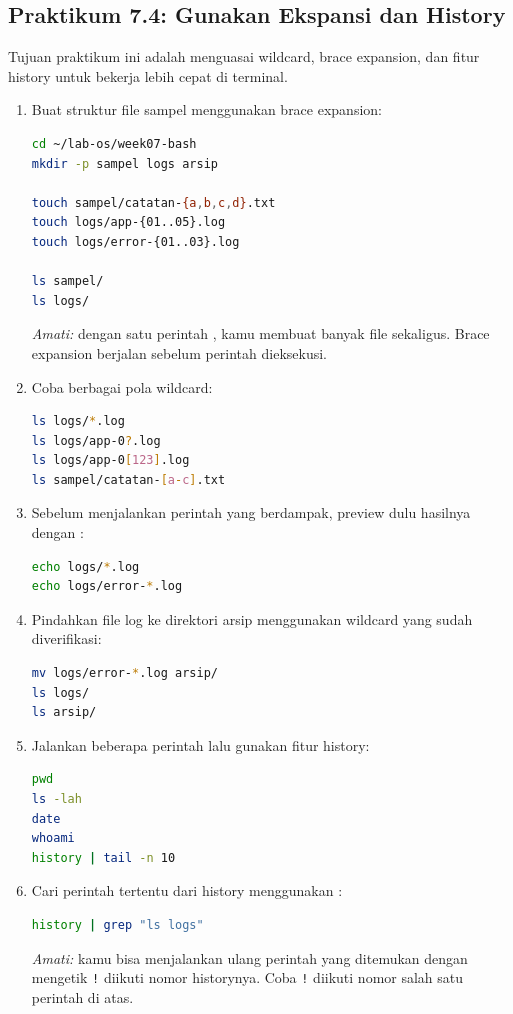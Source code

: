 \subsection*{Praktikum 7.4: Gunakan Ekspansi dan History}

Tujuan praktikum ini adalah menguasai wildcard, brace expansion, dan
fitur history untuk bekerja lebih cepat di terminal.

\begin{enumerate}
    \item Buat struktur file sampel menggunakan brace expansion:
\begin{lstlisting}[language=bash, caption={Membuat file sampel dengan brace expansion}]
cd ~/lab-os/week07-bash
mkdir -p sampel logs arsip

touch sampel/catatan-{a,b,c,d}.txt
touch logs/app-{01..05}.log
touch logs/error-{01..03}.log

ls sampel/
ls logs/
\end{lstlisting}
    \textit{Amati:} dengan satu perintah , kamu membuat banyak
    file sekaligus. Brace expansion berjalan sebelum perintah dieksekusi.

    \item Coba berbagai pola wildcard:
\begin{lstlisting}[language=bash, caption={Menggunakan wildcard untuk memfilter file}]
ls logs/*.log
ls logs/app-0?.log
ls logs/app-0[123].log
ls sampel/catatan-[a-c].txt
\end{lstlisting}

    \item Sebelum menjalankan perintah yang berdampak, preview dulu hasilnya
          dengan :
\begin{lstlisting}[language=bash, caption={Preview wildcard sebelum operasi nyata}]
echo logs/*.log
echo logs/error-*.log
\end{lstlisting}

    \item Pindahkan file log ke direktori arsip menggunakan wildcard yang
          sudah diverifikasi:
\begin{lstlisting}[language=bash, caption={Memindahkan file log ke arsip}]
mv logs/error-*.log arsip/
ls logs/
ls arsip/
\end{lstlisting}

    \item Jalankan beberapa perintah lalu gunakan fitur history:
\begin{lstlisting}[language=bash, caption={Menggunakan history Bash}]
pwd
ls -lah
date
whoami
history | tail -n 10
\end{lstlisting}

    \item Cari perintah tertentu dari history menggunakan :
\begin{lstlisting}[language=bash, caption={Mencari perintah di history}]
history | grep "ls logs"
\end{lstlisting}
    \textit{Amati:} kamu bisa menjalankan ulang perintah yang ditemukan
    dengan mengetik \texttt{!} diikuti nomor historynya. Coba \texttt{!}
    diikuti nomor salah satu perintah di atas.
\end{enumerate}

